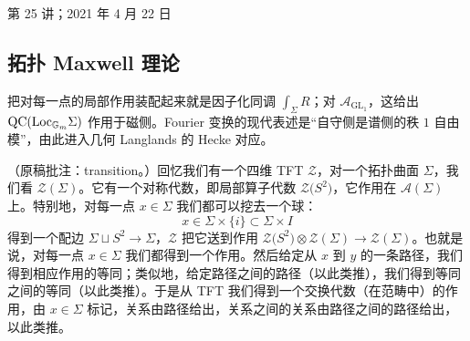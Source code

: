 \begin{flushright}\small 第 25 讲；2021 年 4 月 22 日\end{flushright}

\subsection{拓扑 Maxwell 理论}\label{sec:10-8-5}

\begin{sectionkey}
把对每一点的局部作用装配起来就是因子化同调 $\int_\Sigma R$；对 $\mathcal{A}_{\mathrm{GL}_1}$，这给出 $\mathrm{QC}(\mathrm{Loc}_{\mathbb{G}_m}\Sigma)$ 作用于磁侧。Fourier 变换的现代表述是“自守侧是谱侧的秩 $1$ 自由模”，由此进入几何 Langlands 的 Hecke 对应。
\end{sectionkey}

（原稿批注：transition。）回忆我们有一个四维 TFT $\mathcal{Z}$，对一个拓扑曲面 $\Sigma$，我们看 $\mathcal{Z}(\Sigma)$。它有一个对称代数，即局部算子代数 $\mathcal{Z}\big(S^2\big)$，它作用在 $\mathcal{A}(\Sigma)$ 上。特别地，对每一点 $x\in\Sigma$ 我们都可以挖去一个球：
\begin{equation}\tag{10.222}
x\in\Sigma\times\{i\}\subset\Sigma\times I
\end{equation}
得到一个配边 $\Sigma\sqcup S^2\to\Sigma$，$\mathcal{Z}$ 把它送到作用 $\mathcal{Z}\big(S^2\big)\otimes\mathcal{Z}(\Sigma)\to\mathcal{Z}(\Sigma)$。也就是说，对每一点 $x\in\Sigma$ 我们都得到一个作用。然后给定从 $x$ 到 $y$ 的一条路径，我们得到相应作用的等同；类似地，给定路径之间的路径（以此类推），我们得到等同之间的等同（以此类推）。于是从 TFT 我们得到一个交换代数（在范畴中）的作用，由 $x\in\Sigma$ 标记，关系由路径给出，关系之间的关系由路径之间的路径给出，以此类推。

